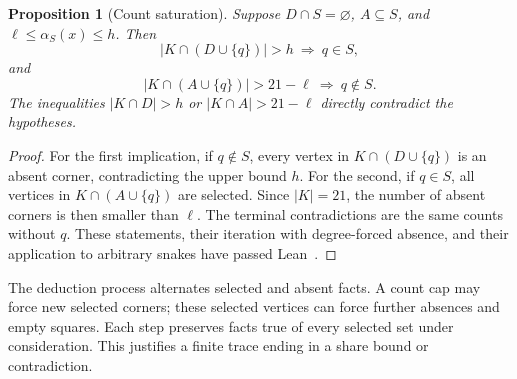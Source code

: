 \documentclass[11pt,a4paper]{article}
\newtheorem{proposition}[theorem]{Proposition}
\theoremstyle{definition}
\theoremstyle{remark}
\begin{document}
\begin{proposition}[Count saturation]\label{prop:count-saturation}
Suppose $D\cap S=\varnothing$, $A\subseteq S$, and $\ell\le\alpha_S(x)\le h$. Then
\[
|K\cap(D\cup\{q\})|>h\ \Longrightarrow\ q\in S,
\]
and
\[
|K\cap(A\cup\{q\})|>21-\ell\ \Longrightarrow\ q\notin S.
\]
The inequalities $|K\cap D|>h$ or $|K\cap A|>21-\ell$ directly contradict the hypotheses.
\end{proposition}
\begin{proof}
For the first implication, if $q\notin S$, every vertex in $K\cap(D\cup\{q\})$ is an absent corner, contradicting the upper bound $h$. For the second, if $q\in S$, all vertices in $K\cap(A\cup\{q\})$ are selected. Since $|K|=21$, the number of absent corners is then smaller than $\ell$. The terminal contradictions are the same counts without $q$. These statements, their iteration with degree-forced absence, and their application to arbitrary snakes have passed Lean~\cite{choicearchive}.
\end{proof}

The deduction process alternates selected and absent facts. A count cap may force new selected corners; these selected vertices can force further absences and empty squares. Each step preserves facts true of every selected set under consideration. This justifies a finite trace ending in a share bound or contradiction.
\end{document}
